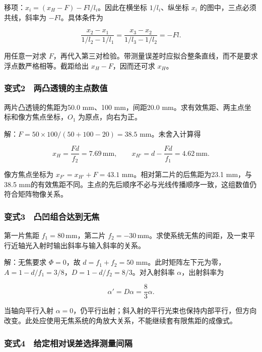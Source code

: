 \documentclass[12pt,a4paper,fontset=fandol]{ctexart}
\begin{document}
移项：\(x_i=(x_H-F)-Fl/l_i\)。因此在横坐标 \(1/l_i\)、纵坐标 \(x_i\)
的图中，三点必须共线，斜率为 \(-Fl\)。具体条件为

\[\frac{x_2-x_1}{1/l_2-1/l_1}
=\frac{x_3-x_2}{1/l_3-1/l_2}=-Fl.\]

用任意一对求
\(F\)，再代入第三对检验。带测量误差时应拟合整条直线，而不是要求浮点数严格相等。截距给出
\(x_H-F\)，因而还可求 \(x_H\)。

\subsubsection{变式2　两凸透镜的主点数值}\label{ux53d8ux5f0f2-ux4e24ux51f8ux900fux955cux7684ux4e3bux70b9ux6570ux503c}

两片凸透镜的焦距为50.0 mm、100 mm，间距20.0
mm。求有效焦距、两主点坐标和像方焦点坐标，\(O_1\) 为原点，向右为正。

解：\(F=50\times100/(50+100-20)=38.5\) mm。未舍入计算得

\[x_H=\frac{Fd}{f_2}=7.69\,\mathrm{mm},\qquad
x_{H'}=d-\frac{Fd}{f_1}=4.62\,\mathrm{mm}.\]

像方焦点坐标为 \(x_{F'}=x_{H'}+F=43.1\) mm。相对第二片的后焦距为23.1
mm，与38.5
mm的有效焦距不同。主点的先后顺序不必与光线传播顺序一致，这组数值仍符合矩阵物像关系。

\subsubsection{变式3　凸凹组合达到无焦}\label{ux53d8ux5f0f3-ux51f8ux51f9ux7ec4ux5408ux8fbeux5230ux65e0ux7126}

第一片焦距 \(f_1=80\,\mathrm{mm}\)，第二片
\(f_2=-30\,\mathrm{mm}\)。求使系统无焦的间距，及一束平行近轴光入射时输出斜率与输入斜率的关系。

解：无焦要求 \(\Phi=0\)，故 \(d=f_1+f_2=50\)
mm。此时矩阵左下元为零，\(A=1-d/f_1=3/8\)，\(D=1-d/f_2=8/3\)。对入射斜率
\(\alpha\)，出射斜率为

\[\alpha'=D\alpha=\frac83\alpha.\]

当轴向平行入射
\(\alpha=0\)，仍平行出射；斜入射的平行光束也保持内部平行，但方向改变。此处应使用无焦系统的角放大关系，不能继续套有限焦距的成像式。

\subsubsection{变式4　给定相对误差选择测量间隔}\label{ux53d8ux5f0f4-ux7ed9ux5b9aux76f8ux5bf9ux8befux5deeux9009ux62e9ux6d4bux91cfux95f4ux9694}
\end{document}
